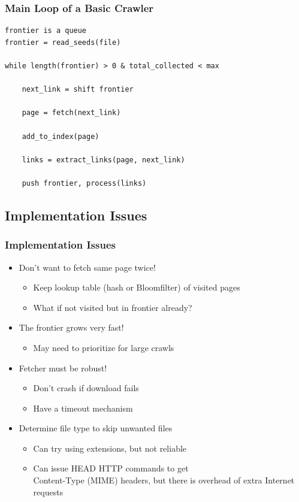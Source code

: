 \documentclass{beamer}
\begin{document}
\begin{frame}[fragile] \frametitle{Main Loop of a Basic Crawler }
 
\begin{verbatim}
frontier is a queue
frontier = read_seeds(file)

while length(frontier) > 0 & total_collected < max

    next_link = shift frontier

    page = fetch(next_link)

    add_to_index(page)

    links = extract_links(page, next_link)

    push frontier, process(links)

\end{verbatim}

\end{frame}

\subsection{Implementation Issues}

\begin{frame} \frametitle{Implementation Issues}

\begin{itemize}

\item Don't want to fetch same page twice!
\begin{itemize}
\item Keep lookup table (hash or Bloomfilter) of visited pages
\item What if not visited but in frontier already?
\end{itemize}

\item The frontier grows very fast!
\begin{itemize}
\item May need to prioritize for large crawls
\end{itemize}

\item Fetcher must be robust! 
\begin{itemize}
\item Don't crash if download fails
\item Have a timeout mechanism
\end{itemize}

\item Determine file type to skip unwanted files
\begin{itemize}
\item Can try using extensions, but not reliable
\item Can issue HEAD HTTP commands to get \\ Content-Type (MIME)
  headers, but there is overhead of extra Internet requests
\end{itemize}

\end{itemize}

\end{frame}
\end{document}

